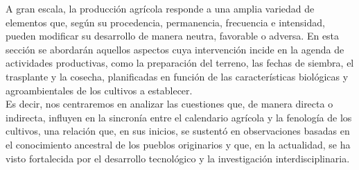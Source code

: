 A gran escala, la producción agrícola responde a una amplia variedad de elementos que, según su procedencia, permanencia, frecuencia e intensidad, pueden modificar su desarrollo de manera neutra, favorable o adversa. En esta sección se abordarán aquellos aspectos cuya intervención incide en la agenda de actividades productivas, como la preparación del terreno, las fechas de siembra, el trasplante y la cosecha, planificadas en función de las características biológicas y agroambientales de los cultivos a establecer.\\

Es decir, nos centraremos en analizar las cuestiones que, de manera directa o indirecta, influyen en la sincronía entre el calendario agrícola y la fenología de los cultivos, una relación que, en sus inicios, se sustentó en observaciones basadas en el conocimiento ancestral de los pueblos originarios y que, en la actualidad, se ha visto fortalecida por el desarrollo tecnológico y la investigación interdisciplinaria.